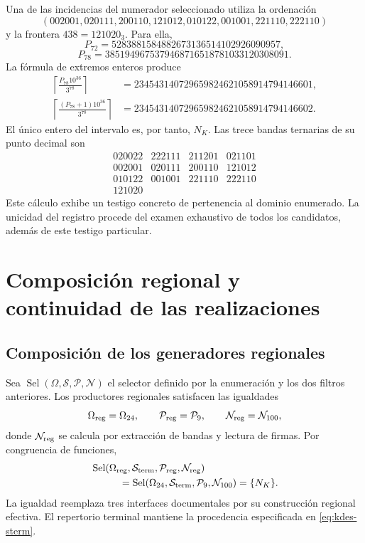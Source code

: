 Una de las incidencias del numerador seleccionado utiliza la ordenación
\[
 (002001,020111,200110,121012,010122,001001,221110,222110)
\]
y la frontera $438=121020_3$. Para ella,
\[
 P_{72}=5283881584882673136514102926090957,
\]
\[
 P_{78}=3851949675379468716518781033120308091.
\]
La fórmula de extremos enteros produce
\begin{align*}
 \left\lceil\frac{P_{78}10^{36}}{3^{78}}\right\rceil
 &=234543140729659824621058914794146601,\\
 \left\lceil\frac{(P_{78}+1)10^{36}}{3^{78}}\right\rceil
 &=234543140729659824621058914794146602.
\end{align*}
El único entero del intervalo es, por tanto, $N_K$. Las trece bandas
ternarias de su punto decimal son
\[
 \begin{array}{rrrr}
 020022&222111&211201&021101\\
 002001&020111&200110&121012\\
 010122&001001&221110&222110\\
 121020&&&
 \end{array}
\]
Este cálculo exhibe un testigo concreto de pertenencia al dominio
enumerado. La unicidad del registro procede del examen exhaustivo de
todos los candidatos, además de este testigo particular.

\section{Composición regional y continuidad de las realizaciones}

\subsection{Composición de los generadores regionales}

Sea $\operatorname{Sel}(\Omega,\mathcal S,\mathcal P,\mathcal N)$ el
selector definido por la enumeración y los dos filtros anteriores.
Los productores regionales satisfacen las igualdades
\[
 \Omega_{\rm reg}=\Omega_{24},\qquad
 \mathcal P_{\rm reg}=\mathcal P_9,\qquad
 \mathcal N_{\rm reg}=\mathcal N_{100},
\]
donde $\mathcal N_{\rm reg}$ se calcula por extracción de bandas y
lectura de firmas. Por congruencia de funciones,
\begin{equation}
 \begin{split}
 &\operatorname{Sel}(\Omega_{\rm reg},\mathcal S_{\rm term},
                    \mathcal P_{\rm reg},\mathcal N_{\rm reg})\\
 &\hspace{10mm}=
 \operatorname{Sel}(\Omega_{24},\mathcal S_{\rm term},
                    \mathcal P_9,\mathcal N_{100})=\{N_K\}.
 \end{split}
 \label{eq:kdes-composicion}
\end{equation}
La igualdad reemplaza tres interfaces documentales por su construcción
regional efectiva. El repertorio terminal mantiene la procedencia
especificada en \eqref{eq:kdes-sterm}.

